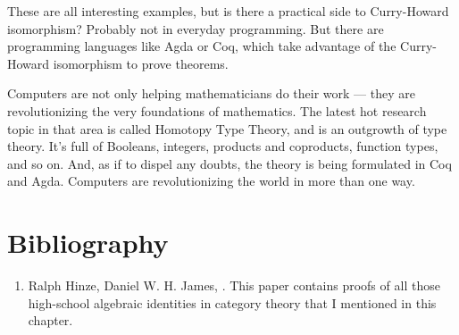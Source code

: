 These are all interesting examples, but is there a practical side to
Curry-Howard isomorphism? Probably not in everyday programming. But
there are programming languages like Agda or Coq, which take advantage
of the Curry-Howard isomorphism to prove theorems.

Computers are not only helping mathematicians do their work --- they are
revolutionizing the very foundations of mathematics. The latest hot
research topic in that area is called Homotopy Type Theory, and is an
outgrowth of type theory. It's full of Booleans, integers, products and
coproducts, function types, and so on. And, as if to dispel any doubts,
the theory is being formulated in Coq and Agda. Computers are
revolutionizing the world in more than one way.

\section{Bibliography}

\begin{enumerate}
\tightlist
\item
  Ralph Hinze, Daniel W. H. James,
  . This paper contains proofs of all those high-school
  algebraic identities in category theory that I mentioned in this
  chapter.
\end{enumerate}
